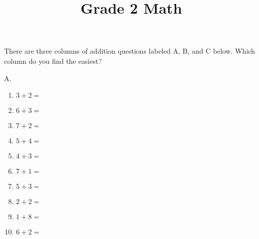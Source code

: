 \documentclass[a4paper,12pt]{article}
\title{\huge \textbf{Grade 2 Math}}
\author{}
\date{}
\begin{document}
\maketitle

\vspace{-0.6cm}

There are three columns of addition questions labeled A, B, and C below. Which column do you find the easiest?
\begin{multicols}{3}  %

A.
\begin{enumerate}[label=\arabic*.]
    \item \textbf{\Large $3 + 2 =$} \underline{\hspace{1cm}} \vspace{0.5 cm}
    \item \textbf{\Large $6 + 3 =$} \underline{\hspace{1cm}} \vspace{0.5cm}
    \item \textbf{\Large $7 + 2 =$} \underline{\hspace{1cm}} \vspace{0.5cm}
    \item \textbf{\Large $5 + 4 =$} \underline{\hspace{1cm}} \vspace{0.5cm}
    \item \textbf{\Large $4 + 3 =$} \underline{\hspace{1cm}} \vspace{0.5cm}
    \item \textbf{\Large $7 + 1 =$} \underline{\hspace{1cm}} \vspace{0.5 cm}
    \item \textbf{\Large $5 + 3 =$} \underline{\hspace{1cm}} \vspace{0.5cm}
    \item \textbf{\Large $2 + 2 =$} \underline{\hspace{1cm}} \vspace{0.5cm}
    \item \textbf{\Large $1 + 8 =$} \underline{\hspace{1cm}} \vspace{0.5cm}
    \item \textbf{\Large $6 + 2 =$} \underline{\hspace{1cm}} \vspace{0.5cm} %
\end{enumerate}


\end{multicols}
\end{document}
